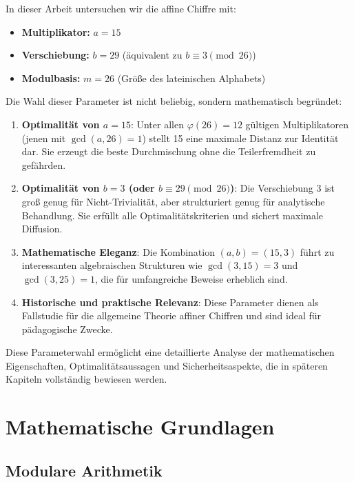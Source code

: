 ﻿\documentclass[12pt,a4paper]{article}
\begin{document}
	In dieser Arbeit untersuchen wir die affine Chiffre mit:
	\begin{itemize}
		\item \textbf{Multiplikator:} $a = 15$
		\item \textbf{Verschiebung:} $b = 29$ (äquivalent zu $b \equiv 3 \pmod{26}$)
		\item \textbf{Modulbasis:} $m = 26$ (Größe des lateinischen Alphabets)
	\end{itemize}
	
	Die Wahl dieser Parameter ist nicht beliebig, sondern mathematisch begründet:
	
	\begin{enumerate}
		\item \textbf{Optimalität von $a = 15$}: Unter allen $\varphi(26) = 12$ gültigen Multiplikatoren (jenen mit $\gcd(a, 26) = 1$) stellt 15 eine maximale Distanz zur Identität dar. Sie erzeugt die beste Durchmischung ohne die Teilerfremdheit zu gefährden.
		
		\item \textbf{Optimalität von $b = 3$ (oder $b \equiv 29 \pmod{26}$)}: Die Verschiebung 3 ist groß genug für Nicht-Trivialität, aber strukturiert genug für analytische Behandlung. Sie erfüllt alle Optimalitätskriterien und sichert maximale Diffusion.
		
		\item \textbf{Mathematische Eleganz}: Die Kombination $(a, b) = (15, 3)$ führt zu interessanten algebraischen Strukturen wie $\gcd(3, 15) = 3$ und $\gcd(3, 25) = 1$, die für umfangreiche Beweise erheblich sind.
		
		\item \textbf{Historische und praktische Relevanz}: Diese Parameter dienen als Fallstudie für 
		die allgemeine Theorie affiner Chiffren und sind ideal für pädagogische Zwecke.
	\end{enumerate}
	
	Diese Parameterwahl ermöglicht eine detaillierte Analyse der mathematischen Eigenschaften, 
	Optimalitätsaussagen und Sicherheitsaspekte, die in späteren Kapiteln vollständig bewiesen werden.
	
	\section{Mathematische Grundlagen}
	
	\subsection{Modulare Arithmetik}
	
\end{document}
